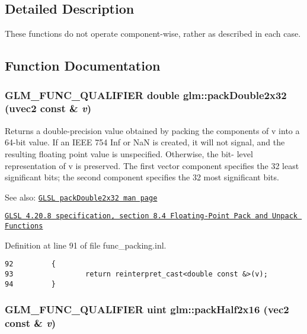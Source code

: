 \subsection{Detailed Description}
These functions do not operate component-wise, rather as described in each case. 

\subsection{Function Documentation}
\hypertarget{group__core__func__packing_gf728fdfb98ce34da6f968d9f6bf154d7}{
\subsubsection[packDouble2x32]{\setlength{\rightskip}{0pt plus 5cm}GLM\_\-FUNC\_\-QUALIFIER double glm::packDouble2x32 (uvec2 const \& {\em v})}}
\label{group__core__func__packing_gf728fdfb98ce34da6f968d9f6bf154d7}


Returns a double-precision value obtained by packing the components of v into a 64-bit value. If an IEEE 754 Inf or NaN is created, it will not signal, and the resulting floating point value is unspecified. Otherwise, the bit- level representation of v is preserved. The first vector component specifies the 32 least significant bits; the second component specifies the 32 most significant bits.

\begin{Desc}
\item[See also:]\href{http://www.opengl.org/sdk/docs/manglsl/xhtml/packDouble2x32.xml}{\tt GLSL packDouble2x32 man page} 

\href{http://www.opengl.org/registry/doc/GLSLangSpec.4.20.8.pdf}{\tt GLSL 4.20.8 specification, section 8.4 Floating-Point Pack and Unpack Functions} \end{Desc}


Definition at line 91 of file func\_\-packing.inl.

\begin{Code}\begin{verbatim}92         {
93                 return reinterpret_cast<double const &>(v);
94         }
\end{verbatim}
\end{Code}


\hypertarget{group__core__func__packing_g082f6dd65f73a547ed3067ef00be036f}{
\subsubsection[packHalf2x16]{\setlength{\rightskip}{0pt plus 5cm}GLM\_\-FUNC\_\-QUALIFIER uint glm::packHalf2x16 (vec2 const \& {\em v})}}
\label{group__core__func__packing_g082f6dd65f73a547ed3067ef00be036f}


